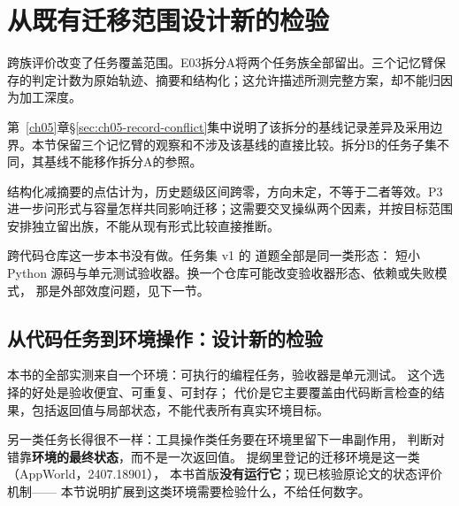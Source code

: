 \section{从既有迁移范围设计新的检验}
\label{sec:ch15-family}

\begin{sloppypar}
跨族评价改变了任务覆盖范围。E03拆分A将两个任务族全部留出。三个记忆臂保存的判定计数为原始轨迹、摘要和结构化；这允许描述所测完整方案，却不能归因为加工深度。
\end{sloppypar}

\begin{sloppypar}
第~\ref{ch05}章\S\ref{sec:ch05-record-conflict}集中说明了该拆分的基线记录差异及采用边界。本节保留三个记忆臂的观察和不涉及该基线的直接比较。拆分B的任务子集不同，其基线不能移作拆分A的参照。
\end{sloppypar}

\begin{sloppypar}
结构化减摘要的点估计为，历史题级区间\measured{$[-0.1500,+0.1125]$}跨零，方向未定，不等于二者等效。P3进一步问形式与容量怎样共同影响迁移；这需要交叉操纵两个因素，并按目标范围安排独立留出族，不能从现有形式比较直接推断。\end{sloppypar}

\begin{sloppypar}
跨代码仓库这一步本书没有做。任务集 v1 的  道题全部是同一类形态：
短小 Python 源码与单元测试验收器。换一个仓库可能改变验收器形态、依赖或失败模式，
那是外部效度问题，见下一节。
\end{sloppypar}

\subsection{从代码任务到环境操作：设计新的检验}
\label{sec:ch15-domain}

\begin{sloppypar}
本书的全部实测来自一个环境：可执行的编程任务，验收器是单元测试。
这个选择的好处是验收便宜、可重复、可封存；
代价是它主要覆盖由代码断言检查的结果，包括返回值与局部状态，不能代表所有真实环境目标。
\end{sloppypar}

\begin{sloppypar}
另一类任务长得很不一样：工具操作类任务要在环境里留下一串副作用，
判断对错靠\textbf{环境的最终状态}，而不是一次返回值。
提纲里登记的迁移环境是这一类（AppWorld，2407.18901），
本书首版\textbf{没有运行它}；现已核验原论文的状态评价机制\cite{appworld-2407}——
本节说明扩展到这类环境需要检验什么，不给任何数字。
\end{sloppypar}

